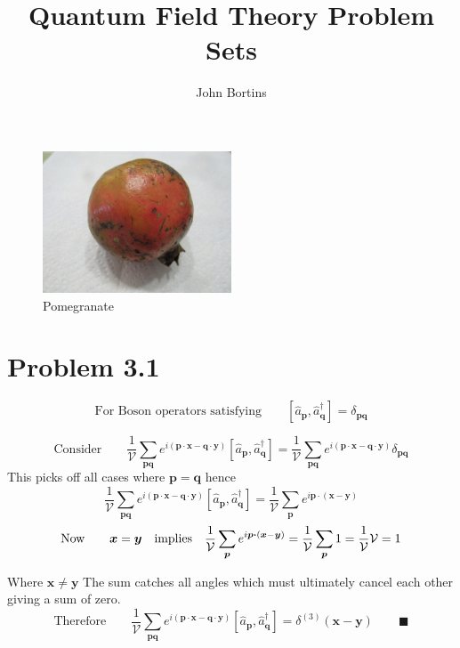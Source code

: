 \documentclass{amsart}
\title{Quantum Field Theory Problem Sets}
\author{John Bortins}
\begin{document}
 
\maketitle{}
\begin{figure}[H]
    \centering
    \includegraphics[width=0.5\textwidth]{IMG_0873}
    \caption{Pomegranate}
    \label{fig:awesome_image}
\end{figure}


\section*{Problem 3.1}

\[\text{For Boson operators satisfying}\qquad[\hat{a}_{\boldsymbol{p}},\hat{a}^\dagger_{\boldsymbol{q}}]  = \delta_{\boldsymbol{pq}}  \]

\[\text{Consider}\qquad \frac{1}{\mathcal{V}}\sum_{\boldsymbol{pq}}e^{i(\boldsymbol{p\cdot x}-\boldsymbol{q\cdot y})}[\hat{a}_{\boldsymbol{p}},\hat{a}^\dagger_{\boldsymbol{q}}]=\frac{1}{\mathcal{V}}\sum_{\boldsymbol{pq}}e^{i(\boldsymbol{p\cdot x}-\boldsymbol{q\cdot y})}\delta_{\boldsymbol{pq}}  \]
This picks off all cases where $\boldsymbol{p}=\boldsymbol{q}$ hence
\[\frac{1}{\mathcal{V}}\sum_{\boldsymbol{pq}}e^{i(\boldsymbol{p\cdot x}-\boldsymbol{q\cdot y})}[\hat{a}_{\boldsymbol{p}},\hat{a}^\dagger_{\boldsymbol{q}}]=\frac{1}{\mathcal{V}}\sum_{\boldsymbol{p}}e^{i\boldsymbol{p\cdot} (\boldsymbol{x}-\boldsymbol{y}) } \]
\[\text{Now}\qquad \boldsymbol{x}=\boldsymbol{y}\qq{implies} \frac{1}{\mathcal{V}}\sum_{\boldsymbol{p}}e^{i\boldsymbol{p\cdot} (\boldsymbol{x}-\boldsymbol{y})}=\frac{1}{\mathcal{V}}\sum_{\boldsymbol{p}}1=\frac{1}{\mathcal{V}}\mathcal{V}=1 \]

Where $\boldsymbol{x}\ne \boldsymbol{y}$ The sum catches all angles which must ultimately cancel each other giving a sum of zero.
\[\text{Therefore}\qquad\frac{1}{\mathcal{V}}\sum_{\boldsymbol{pq}}e^{i(\boldsymbol{p\cdot x}-\boldsymbol{q\cdot y})}[\hat{a}_{\boldsymbol{p}},\hat{a}^\dagger_{\boldsymbol{q}}]=\delta^{(3)} (\boldsymbol{x}-\boldsymbol{y})\qquad\blacksquare\]
\end{document}
